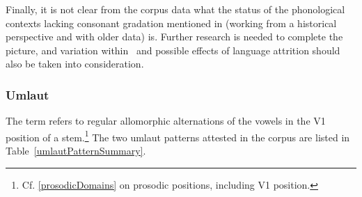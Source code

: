 Finally, it is not clear from the corpus data what the status of the phonological contexts lacking consonant gradation mentioned in \citet[21]{Sammallahti1998} (working from a historical perspective and with older data) is. Further research is needed to complete the picture, and %
variation within \PS\ and possible effects of language attrition should also be taken into consideration.



\subsubsection{Umlaut}\label{umlaut}
The term  refers to regular allomorphic alternations of the vowels in the V1 position of a stem.\footnote{Cf. \SEC\ref{prosodicDomains} on prosodic positions, including V1 position.} 
The two umlaut patterns attested in the corpus are listed in Table~\vref{umlautPatternSummary}. %
